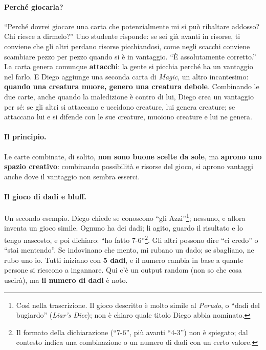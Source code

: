 \paragraph{Perché giocarla?} ``Perché dovrei giocare una carta che potenzialmente mi si può
ribaltare addosso? Chi riesce a dirmelo?'' Uno studente risponde: se sei già avanti in
risorse, ti conviene che gli altri perdano risorse picchiandosi, come negli scacchi conviene
scambiare pezzo per pezzo quando si è in vantaggio. ``È assolutamente corretto.'' La carta
genera comunque \textbf{attacchi}: la gente si picchia perché ha un vantaggio nel farlo. E
Diego aggiunge una seconda carta di \emph{Magic}, un altro incantesimo: \textbf{quando una
creatura muore, genero una creatura debole}. Combinando le due carte, anche quando la
maledizione è contro di lui, Diego crea un vantaggio per sé: se gli altri si attaccano e
uccidono creature, lui genera creature; se attaccano lui e si difende con le sue creature,
muoiono creature e lui ne genera.

\paragraph{Il principio.} Le carte combinate, di solito, \textbf{non sono buone scelte da
sole}, ma \textbf{aprono uno spazio creativo}: combinando possibilità e risorse del gioco, si
aprono vantaggi anche dove il vantaggio non sembra esserci.

\paragraph{Il gioco di dadi e bluff.} Un secondo esempio. Diego chiede se conoscono ``gli
Azzi''\footnote{Così nella trascrizione. Il gioco descritto è molto simile al \emph{Perudo},
o ``dadi del bugiardo'' (\emph{Liar's Dice}); non è chiaro quale titolo Diego abbia nominato.};
nessuno, e allora inventa un gioco simile. Ognuno ha dei dadi; li agito, guardo il risultato
e lo tengo nascosto, e poi dichiaro: ``ho fatto 7-6''\footnote{Il formato della dichiarazione
(``7-6'', più avanti ``4-3'') non è spiegato; dal contesto indica una combinazione o un numero
di dadi con un certo valore.}. Gli altri possono dire ``ci credo'' o ``stai mentendo''. Se
indovinano che mento, mi rubano un dado; se sbagliano, ne rubo uno io. Tutti iniziano con
\textbf{5 dadi}, e il numero cambia in base a quante persone si riescono a ingannare. Qui c'è
un output random (non so che cosa uscirà), ma \textbf{il numero di dadi} è noto.

